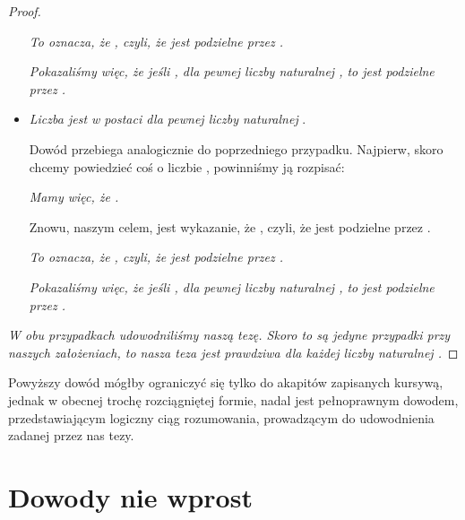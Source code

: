 \begin{example}
\begin{proof}
\begin{itemize}
    \textit{To oznacza, że , czyli, że  jest podzielne przez .}
    
    \textit{Pokazaliśmy więc, że jeśli , dla pewnej liczby naturalnej , to  jest podzielne przez .}
    
    \item \textit{Liczba jest w postaci  dla pewnej liczby naturalnej }.
    
    Dowód przebiega analogicznie do poprzedniego przypadku. Najpierw, skoro chcemy powiedzieć coś o liczbie , powinniśmy ją rozpisać:
    
    \textit{Mamy więc, że .}
    
     Znowu, naszym celem, jest wykazanie, że , czyli, że  jest podzielne przez .
    
    \textit{To oznacza, że , czyli, że  jest podzielne przez .}
    
    \textit{Pokazaliśmy więc, że jeśli , dla pewnej liczby naturalnej , to  jest podzielne przez .}
\end{itemize}

\textit{W obu przypadkach udowodniliśmy naszą tezę. Skoro to są jedyne przypadki przy naszych założeniach, to nasza teza jest prawdziwa dla każdej liczby naturalnej .}

\end{proof}

Powyższy dowód mógłby ograniczyć się tylko do akapitów zapisanych kursywą, jednak w obecnej trochę rozciągniętej formie, nadal jest pełnoprawnym dowodem, przedstawiającym logiczny ciąg rozumowania, prowadzącym do udowodnienia zadanej przez nas tezy.
\end{example}



\section{Dowody nie wprost}

